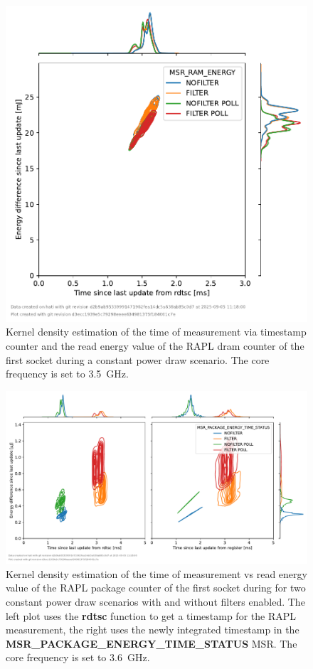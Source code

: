 \begin{figure}[]
    \centering
    \includegraphics[width=0.54\columnwidth]{fig/rapl-update-intervals/MSR_RAM_ENERGY_3500000.pdf}
    \caption{Kernel density estimation of the time of measurement via timestamp counter and the read energy value of the RAPL dram counter of the first socket during a constant power draw scenario.
    The core frequency is set to \SI{3.5}{\GHz}.}
\end{figure}

\clearpage
\begin{figure}[]
    \centering
    \includegraphics[width=\columnwidth]{fig/rapl-update-intervals/MSR_PACKAGE_ENERGY_TIME_STATUS_3600000.pdf}
    \caption{Kernel density estimation of the time of measurement vs read energy value of the RAPL package counter of the first socket during for two constant power draw scenarios with and without filters enabled.
    The left plot uses the \textbf{rdtsc} function to get a timestamp for the RAPL measurement, the right uses the newly integrated timestamp in the \textbf{MSR\_PACKAGE\_ENERGY\_TIME\_STATUS} MSR.
    The core frequency is set to \SI{3.6}{\GHz}.}
\end{figure}

